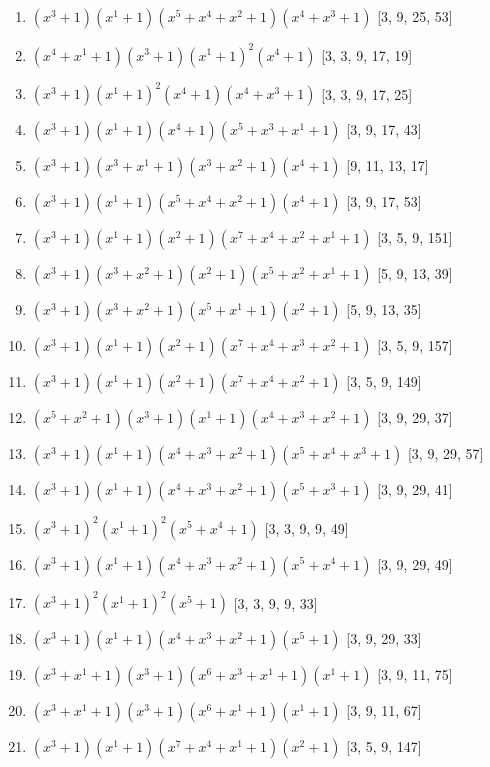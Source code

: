 \documentclass[10pt,twocolumn]{article}
\begin{document}
\begin{enumerate}
\item $(x^{3} + 1)(x^{1} + 1)(x^{5} + x^{4} + x^{2} + 1)(x^{4} + x^{3} + 1)$  [3, 9, 25, 53]
\item $(x^{4} + x^{1} + 1)(x^{3} + 1)(x^{1} + 1)^{2}(x^{4} + 1)$  [3, 3, 9, 17, 19]
\item $(x^{3} + 1)(x^{1} + 1)^{2}(x^{4} + 1)(x^{4} + x^{3} + 1)$  [3, 3, 9, 17, 25]
\item $(x^{3} + 1)(x^{1} + 1)(x^{4} + 1)(x^{5} + x^{3} + x^{1} + 1)$  [3, 9, 17, 43]
\item $(x^{3} + 1)(x^{3} + x^{1} + 1)(x^{3} + x^{2} + 1)(x^{4} + 1)$  [9, 11, 13, 17]
\item $(x^{3} + 1)(x^{1} + 1)(x^{5} + x^{4} + x^{2} + 1)(x^{4} + 1)$  [3, 9, 17, 53]
\item $(x^{3} + 1)(x^{1} + 1)(x^{2} + 1)(x^{7} + x^{4} + x^{2} + x^{1} + 1)$  [3, 5, 9, 151]
\item $(x^{3} + 1)(x^{3} + x^{2} + 1)(x^{2} + 1)(x^{5} + x^{2} + x^{1} + 1)$  [5, 9, 13, 39]
\item $(x^{3} + 1)(x^{3} + x^{2} + 1)(x^{5} + x^{1} + 1)(x^{2} + 1)$  [5, 9, 13, 35]
\item $(x^{3} + 1)(x^{1} + 1)(x^{2} + 1)(x^{7} + x^{4} + x^{3} + x^{2} + 1)$  [3, 5, 9, 157]
\item $(x^{3} + 1)(x^{1} + 1)(x^{2} + 1)(x^{7} + x^{4} + x^{2} + 1)$  [3, 5, 9, 149]
\item $(x^{5} + x^{2} + 1)(x^{3} + 1)(x^{1} + 1)(x^{4} + x^{3} + x^{2} + 1)$  [3, 9, 29, 37]
\item $(x^{3} + 1)(x^{1} + 1)(x^{4} + x^{3} + x^{2} + 1)(x^{5} + x^{4} + x^{3} + 1)$  [3, 9, 29, 57]
\item $(x^{3} + 1)(x^{1} + 1)(x^{4} + x^{3} + x^{2} + 1)(x^{5} + x^{3} + 1)$  [3, 9, 29, 41]
\item $(x^{3} + 1)^{2}(x^{1} + 1)^{2}(x^{5} + x^{4} + 1)$  [3, 3, 9, 9, 49]
\item $(x^{3} + 1)(x^{1} + 1)(x^{4} + x^{3} + x^{2} + 1)(x^{5} + x^{4} + 1)$  [3, 9, 29, 49]
\item $(x^{3} + 1)^{2}(x^{1} + 1)^{2}(x^{5} + 1)$  [3, 3, 9, 9, 33]
\item $(x^{3} + 1)(x^{1} + 1)(x^{4} + x^{3} + x^{2} + 1)(x^{5} + 1)$  [3, 9, 29, 33]
\item $(x^{3} + x^{1} + 1)(x^{3} + 1)(x^{6} + x^{3} + x^{1} + 1)(x^{1} + 1)$  [3, 9, 11, 75]
\item $(x^{3} + x^{1} + 1)(x^{3} + 1)(x^{6} + x^{1} + 1)(x^{1} + 1)$  [3, 9, 11, 67]
\item $(x^{3} + 1)(x^{1} + 1)(x^{7} + x^{4} + x^{1} + 1)(x^{2} + 1)$  [3, 5, 9, 147]

\end{enumerate}
\end{document}
